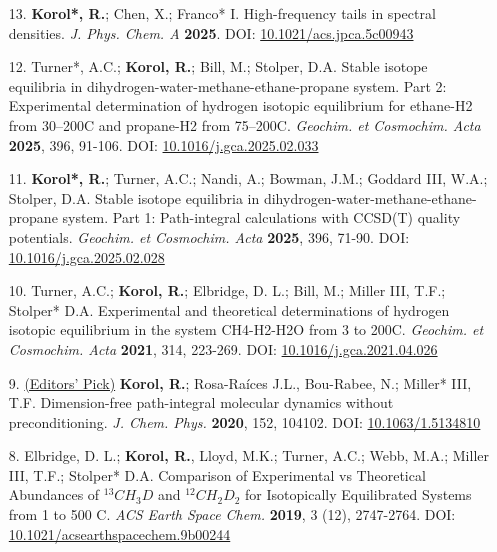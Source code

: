 
\begin{enumerate}
\item[13.] \textbf{Korol*, R.}; Chen, X.; Franco* I. High-frequency tails in spectral densities. \textit{J. Phys. Chem. A} \textbf{2025}. DOI: \href{https://pubs.acs.org/doi/10.1021/acs.jpca.5c00943}{10.1021/acs.jpca.5c00943}
\vspace{0.1cm}
	\item[12.] Turner*, A.C.; \textbf{Korol, R.}; Bill, M.; Stolper, D.A. Stable isotope equilibria in dihydrogen-water-methane-ethane-propane system. Part 2: Experimental determination of hydrogen isotopic equilibrium for ethane-H2 from 30--200\degree C and propane-H2 from 75--200\degree C. \textit{Geochim. et Cosmochim. Acta} \textbf{2025}, 396, 91-106. DOI: \href{https://doi.org/10.1016/j.gca.2025.02.033}{10.1016/j.gca.2025.02.033}
	\vspace{0.1cm}
	\item[11.] \textbf{Korol*, R.}; Turner, A.C.; Nandi, A.; Bowman, J.M.; Goddard III, W.A.; Stolper, D.A. Stable isotope equilibria in dihydrogen-water-methane-ethane-propane system. Part 1: Path-integral calculations with CCSD(T) quality potentials. \textit{Geochim. et Cosmochim. Acta} \textbf{2025}, 396, 71-90. DOI: \href{https://doi.org/10.1016/j.gca.2025.02.028}{10.1016/j.gca.2025.02.028}
\vspace{0.1cm}
	\item[10.] Turner, A.C.; \textbf{Korol, R.}; Elbridge, D. L.; Bill, M.; Miller III, T.F.; Stolper* D.A.
Experimental and theoretical determinations of hydrogen isotopic equilibrium in the system CH4-H2-H2O from 3 to 200\degree C. \textit{Geochim. et Cosmochim. Acta} \textbf{2021}, 314, 223-269. DOI: \href{https://doi.org/10.1016/j.gca.2021.04.026}{10.1016/j.gca.2021.04.026}
\vspace{0.1cm}

	\item[9.] \underline{(Editors' Pick)} \textbf{Korol, R.}; Rosa-Ra\'ices J.L., Bou-Rabee,  N.; Miller* III, T.F. Dimension-free path-integral molecular dynamics without preconditioning. \textit{J. Chem. Phys.} \textbf{2020}, 152, 104102. DOI: \href{https://aip.scitation.org/doi/abs/10.1063/1.5134810}{10.1063/1.5134810}
\vspace{0.1cm}

	\item[8.] Elbridge, D. L.; \textbf{Korol, R.}, Lloyd, M.K.; Turner, A.C.; Webb, M.A.; Miller III, T.F.; Stolper* D.A.
Comparison of Experimental vs Theoretical Abundances of $^{13}CH_3D$ and $^{12}CH_2D_2$ for Isotopically Equilibrated Systems from 1 to 500 \degree C. \textit{ACS Earth Space Chem.} \textbf{2019}, 3 (12), 2747-2764. DOI: \href{https://pubs.acs.org/doi/10.1021/acsearthspacechem.9b00244}{10.1021/acsearthspacechem.9b00244}
\vspace{0.1cm}


\end{enumerate}

